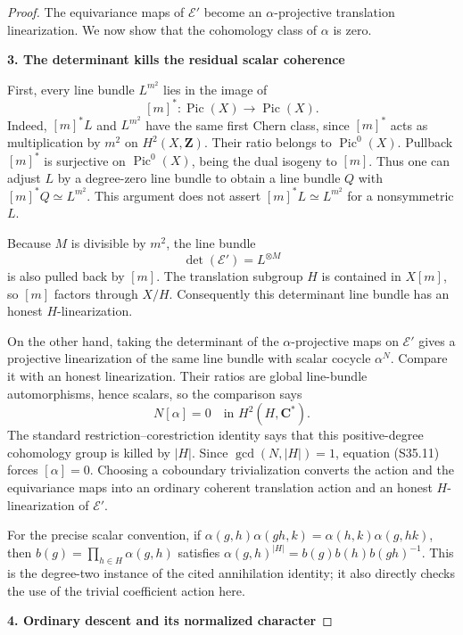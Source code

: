\begin{proof}
The equivariance maps of \(\mathcal E'\) become an \(\alpha\)-projective translation linearization. We now show that the cohomology class of \(\alpha\) is zero.

\par\medskip\noindent\textbf{3. The determinant kills the residual scalar coherence}\quad

First, every line bundle \(L^{m^2}\) lies in the image of \[
 [m]^*:\operatorname{Pic}(X)\longrightarrow\operatorname{Pic}(X).
 \tag{S35.10}
\] Indeed, \([m]^*L\) and \(L^{m^2}\) have the same first Chern class, since \([m]^*\) acts as multiplication by \(m^2\) on \(H^2(X,\mathbf Z)\). Their ratio belongs to \(\operatorname{Pic}^0(X)\). Pullback \([m]^*\) is surjective on \(\operatorname{Pic}^0(X)\), being the dual isogeny to \([m]\). Thus one can adjust \(L\) by a degree-zero line bundle to obtain a line bundle \(Q\) with \([m]^*Q\simeq L^{m^2}\). This argument does not assert \([m]^*L\simeq L^{m^2}\) for a nonsymmetric \(L\).

Because \(M\) is divisible by \(m^2\), the line bundle \[
 \det(\mathcal E')=L^{\otimes M}
\] is also pulled back by \([m]\). The translation subgroup \(H\) is contained in \(X[m]\), so \([m]\) factors through \(X/H\). Consequently this determinant line bundle has an honest \(H\)-linearization.

On the other hand, taking the determinant of the \(\alpha\)-projective maps on \(\mathcal E'\) gives a projective linearization of the same line bundle with scalar cocycle \(\alpha^N\). Compare it with an honest linearization. Their ratios are global line-bundle automorphisms, hence scalars, so the comparison says \[
 N[\alpha]=0\quad\text{in }H^2(H,\mathbf C^*).
 \tag{S35.11}
\] The standard restriction--corestriction identity says that this positive-degree cohomology group is killed by \(|H|\). Since \(\gcd(N,|H|)=1\), equation (S35.11) forces \([\alpha]=0\). Choosing a coboundary trivialization converts the action and the equivariance maps into an ordinary coherent translation action and an honest \(H\)-linearization of \(\mathcal E'\).

For the precise scalar convention, if \(\alpha(g,h)\alpha(gh,k)=\alpha(h,k)\alpha(g,hk)\), then \(b(g)=\prod_{h\in H}\alpha(g,h)\) satisfies \(\alpha(g,h)^{|H|}=b(g)b(h)b(gh)^{-1}\). This is the degree-two instance of the cited annihilation identity; it also directly checks the use of the trivial coefficient action here.

\par\medskip\noindent\textbf{4. Ordinary descent and its normalized character}\quad


\end{proof}
